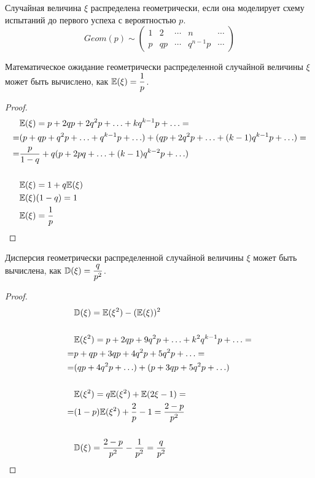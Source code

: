 \documentclass[12pt]{article}
\begin{document}
\begin{definition}
    Случайная величина $\xi$ распределена геометрически, если она моделирует схему испытаний до первого успеха с вероятностью $p$.
    $$Geom(p) \sim \begin{pmatrix}
        1 & 2 & \cdots & n & \cdots\\
        p & qp & \cdots & q^{n-1}p & \cdots
    \end{pmatrix}$$
\end{definition}

\begin{lemma}
    Математическое ожидание геометрически распределенной случайной величины $\xi$ может быть вычислено, как $\mathbb{E}(\xi)=\dfrac{1}{p}$.
\end{lemma}

\begin{proof}
    \begin{align*}
        &\mathbb{E}(\xi)=p+2qp+2q^2p+\ldots+kq^{k-1}p+\ldots=\\
        =&(p+qp+q^2p+\ldots+q^{k-1}p+\ldots)+(qp+2q^2p+\ldots+(k-1)q^{k-1}p+\ldots)=\\
        =&\frac{p}{1-q}+q(p+2pq+\ldots+(k-1)q^{k-2}p+\ldots)\\\\
        &\mathbb{E}(\xi)=1+q\mathbb{E}(\xi)\\
        &\mathbb{E}(\xi)(1-q)=1\\
        &\mathbb{E}(\xi)=\frac{1}{p}
    \end{align*}
\end{proof}

\begin{lemma}
    Дисперсия геометрически распределенной случайной величины $\xi$ может быть вычислена, как $\mathbb{D}(\xi)=\dfrac{q}{p^2}$.
\end{lemma}

\begin{proof}
    \begin{align*}
        &\mathbb{D}(\xi)=\mathbb{E}(\xi^2)-(\mathbb{E}(\xi))^2\\\\
        &\mathbb{E}(\xi^2)=p+2qp+9q^2p+\ldots+k^2q^{k-1}p+\ldots=\\
        =&p+qp+3qp+4q^2p+5q^2p+\ldots=\\
        =&(qp+4q^2p+\ldots)+(p+3qp+5q^2p+\ldots)\\\\
        &\mathbb{E}(\xi^2)=q\mathbb{E}(\xi^2)+\mathbb{E}(2\xi-1)=\\
        =&(1-p)\mathbb{E}(\xi^2)+\frac{2}{p}-1=\frac{2-p}{p^2}\\\\
        &\mathbb{D}(\xi)=\frac{2-p}{p^2}-\frac{1}{p^2}=\frac{q}{p^2}
    \end{align*}
\end{proof}
\end{document}
